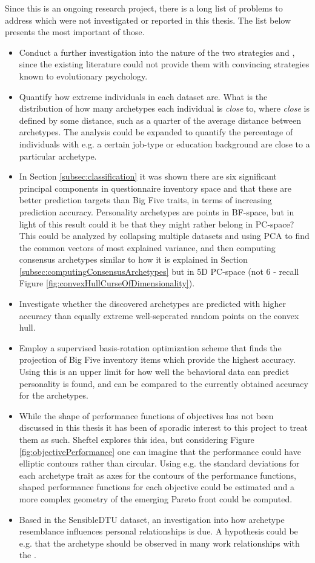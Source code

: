 Since this is an ongoing research project, there is a long list of problems to address which were not investigated or reported in this thesis. The list below presents the most important of those.

\begin{itemize}
	\item Conduct a further investigation into the nature of the two strategies \achiever and \host, since the existing literature could not provide them with convincing strategies known to evolutionary psychology.
	\item Quantify how extreme individuals in each dataset are. What is the distribution of how many archetypes each individual is \textit{close} to, where \textit{close} is defined by some distance, such as a quarter of the average distance between archetypes. The analysis could be expanded to quantify the percentage of individuals with e.g. a certain job-type or education background are close to a particular archetype.
	\item In Section \ref{subsec:classification} it was shown there are six significant principal components in questionnaire inventory space and that these are better prediction targets than Big Five traits, in terms of increasing prediction accuracy. Personality archetypes are points in BF-space, but in light of this result could it be that they might rather belong in PC-space? This could be analyzed by collapsing multiple datasets and using PCA to find the common vectors of most explained variance, and then computing consensus archetypes similar to how it is explained in Section \ref{subsec:computingConsensusArchetypes} but in 5D PC-space (not 6 - recall Figure \ref{fig:convexHullCurseOfDimensionality}).
	\item Investigate whether the discovered archetypes are predicted with higher accuracy than equally extreme well-seperated random points on the convex hull.
	\item Employ a supervised basis-rotation optimization scheme that finds the projection of Big Five inventory items which provide the highest accuracy. Using this is an upper limit for how well the behavioral data can predict personality is found, and can be compared to the currently obtained accuracy for the archetypes.
	\item While the shape of performance functions of objectives has not been discussed in this thesis it has been of sporadic interest to this project to treat them as such. Sheftel explores this idea, but considering Figure \ref{fig:objectivePerformance} one can imagine that the performance could have elliptic contours rather than circular. Using e.g. the standard deviations for each archetype trait as axes for the contours of the performance functions, shaped performance functions for each objective could be estimated and a more complex geometry of the emerging Pareto front could be computed.
	\item Based in the SensibleDTU dataset, an investigation into how archetype resemblance influences personal relationships is due. A hypothesis could be e.g. that the \hippie archetype should be observed in many work relationships with the \wildcard.
\end{itemize}